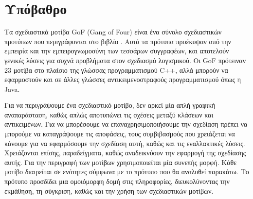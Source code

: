 \section{Υπόβαθρο}
\label{sec:background}
Τα σχεδιαστικά μοτίβα GoF (Gang of Four) είναι ένα σύνολο σχεδιαστικών 
προτύπων που περιγράφονται στο βιβλίο \cite{GoF}. 
Αυτά τα πρότυπα προέκυψαν από την εμπειρία και την εμπειρογνωμοσύνη των 
τεσσάρων συγγραφέων, και αποτελούν γενικές λύσεις για συχνά προβλήματα 
στον σχεδιασμό λογισμικού. Οι GoF πρότειναν 23 μοτίβα στο πλαίσιο της γλώσσας 
προγραμματισμού C++, αλλά μπορούν να εφαρμοστούν και σε άλλες γλώσσες 
αντικειμενοστραφούς προγραμματισμού όπως η Java. \par
Για να περιγράψουμε ένα σχεδιαστικό μοτίβο, δεν αρκεί μία απλή γραφική 
αναπαράσταση, καθώς απλώς αποτυπώνει τις σχέσεις μεταξύ κλάσεων και αντικειμένων. 
Για να μπορέσουμε να επαναχρησιμοποιήσουμε την σχεδίαση πρέπει να μπορούμε 
να καταγράψουμε τις αποφάσεις, τους συμβιβασμούς που χρειάζεται 
να κάνουμε για να εφαρμόσουμε την σχεδίαση αυτή, καθώς και τις εναλλακτικές λύσεις. 
Χρειάζονται επίσης, παραδείγματα, καθώς αναδεικνύουν την εφαρμογή της σχεδίασης 
αυτής. Για την περιγραφή των μοτίβων χρησιμοποιείται μία συνεπής μορφή. 
Κάθε μοτίβο διαιρείται σε ενότητες σύμφωνα με το πρότυπο που θα αναλυθεί παρακάτω. 
Το πρότυπο προσδίδει μια ομοιόμορφη δομή στις πληροφορίες, 
διευκολύνοντας την εκμάθηση, τη σύγκριση, καθώς και την χρήση των 
σχεδιαστικών μοτίβων.
